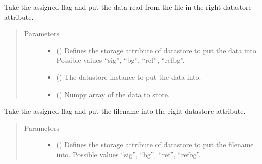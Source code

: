 \documentclass[a4paper,10pt,english]{sphinxmanual}
\begin{document}
\begin{fulllineitems}
\begin{fulllineitems}
\label{\detokenize{sfgtools:sfgtools.SFGProcessTools.assign_data_to_storage}}
\sphinxAtStartPar
Take the assigned flag and put the data read from the file in the right datastore attribute.
\begin{quote}\begin{description}
\item[{Parameters}] \leavevmode\begin{itemize}
\item {} 
\sphinxAtStartPar
{} () \textendash{} Defines the storage attribute of datastore to put the data into. Possible values “sig”, “bg”,
“ref”, “refbg”.

\item {} 
\sphinxAtStartPar
{} () \textendash{} The datastore instance to put the data into.

\item {} 
\sphinxAtStartPar
{} () \textendash{} Numpy array of the data to store.

\end{itemize}

\end{description}\end{quote}

\end{fulllineitems}


\begin{fulllineitems}
\label{\detokenize{sfgtools:sfgtools.SFGProcessTools.assign_filename_to_storage}}
\sphinxAtStartPar
Take the assigned flag and put the filename into the right datastore attribute.
\begin{quote}\begin{description}
\item[{Parameters}] \leavevmode\begin{itemize}
\item {} 
\sphinxAtStartPar
{} () \textendash{} Defines the storage attribute of datastore to put the filename into. Possible values “sig”, “bg”,
“ref”, “refbg”.


\end{itemize}
\end{description}
\end{quote}
\end{fulllineitems}
\end{fulllineitems}
\end{document}
